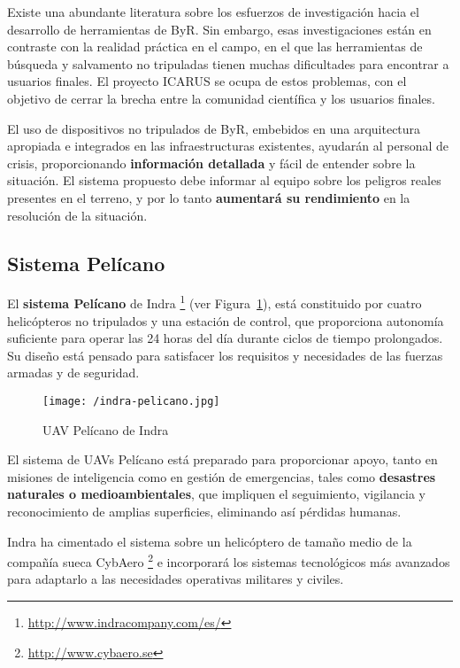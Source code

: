Existe una abundante literatura sobre los esfuerzos de investigación hacia el desarrollo de herramientas de \acs{ByR}. Sin embargo, esas investigaciones están en contraste con la realidad práctica en el campo, en el que las herramientas de búsqueda y salvamento no tripuladas tienen muchas dificultades para encontrar a usuarios finales. El proyecto ICARUS se ocupa de estos problemas, con el objetivo de cerrar la brecha entre la comunidad científica y los usuarios finales.

El uso de dispositivos no tripulados de \acs{ByR}, embebidos en una arquitectura apropiada e integrados en las infraestructuras existentes, ayudarán al personal de crisis, proporcionando \textbf{información detallada} y fácil de entender sobre la situación. El sistema propuesto debe informar al equipo sobre los peligros reales presentes en el terreno, y por lo tanto \textbf{aumentará su rendimiento} en la resolución de la situación.

\subsection{Sistema Pelícano}
\label{sec:pelicano}

El \textbf{sistema Pelícano} de Indra \footnote{\url{http://www.indracompany.com/es/}} (ver Figura~\ref{fig:pelicano}), está constituido por cuatro helicópteros no tripulados y una estación de control, que proporciona autonomía suficiente para operar las 24 horas del día durante ciclos de tiempo prolongados. Su diseño está pensado para satisfacer los requisitos y necesidades de las fuerzas armadas y de seguridad. \\

\begin{figure}[!h]
\begin{center}
\texttt{[image: /indra-pelicano.jpg]}
\caption[\acs{UAV} Pelícano de Indra]{\acs{UAV} Pelícano de Indra}
\label{fig:pelicano}
\end{center}
\end{figure}
 

El sistema de \acs{UAV}s Pelícano \cite{PELICANO} está preparado para proporcionar apoyo, tanto en misiones de inteligencia como en gestión de emergencias, tales como \textbf{desastres naturales o medioambientales}, que impliquen el seguimiento, vigilancia y reconocimiento de amplias superficies, eliminando así pérdidas humanas.

Indra ha cimentado el sistema sobre un helicóptero de tamaño medio de la compañía sueca CybAero \footnote{\url{http://www.cybaero.se}} e incorporará los sistemas tecnológicos más avanzados para adaptarlo a las necesidades operativas militares y civiles. 

